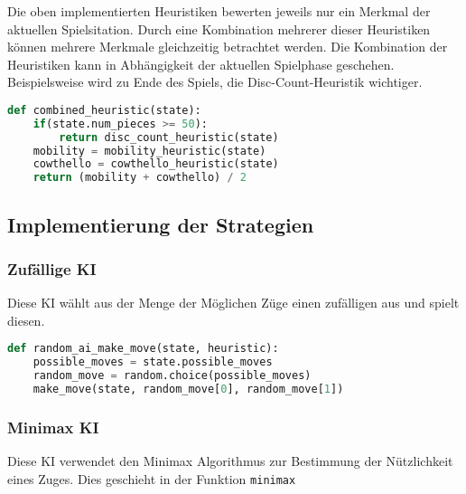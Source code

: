 Die oben implementierten Heuristiken bewerten jeweils nur ein Merkmal
der aktuellen Spielsitation. Durch eine Kombination mehrerer dieser
Heuristiken können mehrere Merkmale gleichzeitig betrachtet werden. Die
Kombination der Heuristiken kann in Abhängigkeit der aktuellen
Spielphase geschehen. Beispielsweise wird zu Ende des Spiels, die
Disc-Count-Heuristik wichtiger.

\begin{lstlisting}[language=Python]
def combined_heuristic(state):
    if(state.num_pieces >= 50):
        return disc_count_heuristic(state)
    mobility = mobility_heuristic(state)
    cowthello = cowthello_heuristic(state)
    return (mobility + cowthello) / 2
\end{lstlisting}

\hypertarget{implementierung-der-strategien}{%
\subsection{Implementierung der
Strategien}\label{implementierung-der-strategien}}

\hypertarget{zufuxe4llige-ki}{%
\subsubsection{Zufällige KI}\label{zufuxe4llige-ki}}

Diese KI wählt aus der Menge der Möglichen Züge einen zufälligen aus und
spielt diesen.

\begin{lstlisting}[language=Python]
def random_ai_make_move(state, heuristic):
    possible_moves = state.possible_moves
    random_move = random.choice(possible_moves)
    make_move(state, random_move[0], random_move[1])
\end{lstlisting}

\hypertarget{minimax-ki}{%
\subsubsection{Minimax KI}\label{minimax-ki}}

Diese KI verwendet den Minimax Algorithmus zur Bestimmung der
Nützlichkeit eines Zuges. Dies geschieht in der Funktion
\passthrough{\lstinline!minimax!}

